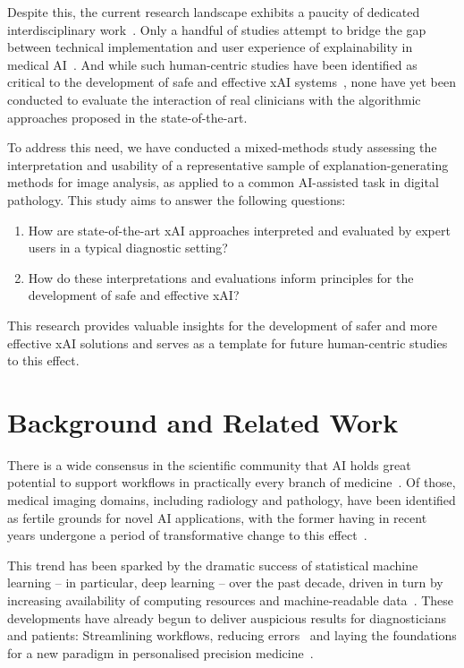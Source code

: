 \documentclass[final,5p,times,twocolumn,hyphens]{elsarticle}
\newcommand{\researchquestions}{
    \begin{enumerate}
        \item How are state-of-the-art xAI approaches interpreted and evaluated by expert users in a typical diagnostic setting?
        \item How do these interpretations and evaluations inform principles for the development of safe and effective xAI?
    \end{enumerate}
}
\begin{document}
Despite this, the current research landscape exhibits a paucity of dedicated interdisciplinary work~\cite{antoniadi2021current}. Only a handful of studies attempt to bridge the gap between technical implementation and user experience of explainability in medical AI~\cite{liao2020questioning,cai2019hello,wang_designing_2019}. And while such human-centric studies have been identified as critical to the development of safe and effective xAI systems~\cite{doshi2017towards, regitnig_expectations_2020, antoniadi2021current}, none have yet been conducted to evaluate the interaction of real clinicians with the algorithmic approaches proposed in the state-of-the-art.

To address this need, we have conducted a mixed-methods study assessing the interpretation and usability of a representative sample of explanation-generating methods for image analysis, as applied to a common AI-assisted task in digital pathology. This study aims to answer the following questions:

\researchquestions

This research provides valuable insights for the development of safer and more effective xAI solutions and serves as a template for future human-centric studies to this effect.

\section{Background and Related Work}

There is a wide consensus in the scientific community that AI holds great potential to support workflows in practically every branch of medicine~\cite{hamet2017artificial}. Of those, medical imaging domains, including radiology and pathology, have been identified as fertile grounds for novel AI applications, with the former having in recent years undergone a period of transformative change to this effect~\cite{WulczynEtAl:2021:AImed-example}.

This trend has been sparked by the dramatic success of statistical machine learning -- in particular, deep learning -- over the past decade, driven in turn by increasing availability of computing resources and machine-readable data~\cite{LeCunBengioHinton:2015:DeepLearningNature}. These developments have already begun to deliver auspicious results for diagnosticians and patients: Streamlining workflows, reducing errors~\cite{Topol:2019:NatureMedicine} and laying the foundations for a new paradigm in personalised precision medicine~\cite{acs2020artificial}. 
\end{document}
